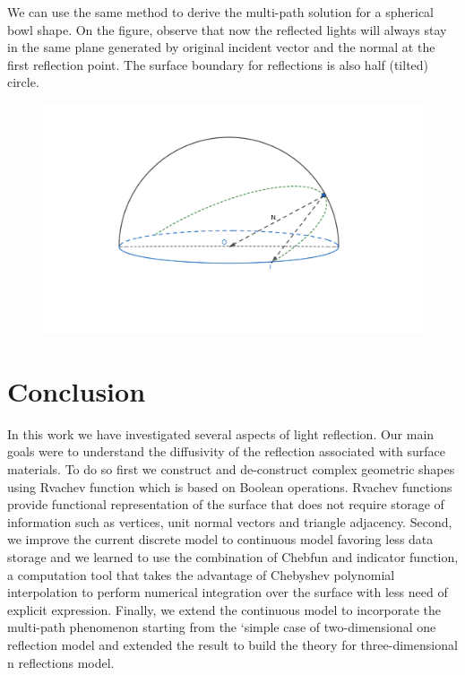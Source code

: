 \documentclass[11pt,reqno]{amsart}
\theoremstyle{definition}
\begin{document}
We can use the same method to derive the multi-path solution for a spherical bowl shape. On the figure, observe that now the reflected lights will always stay in the same plane generated by original incident vector and the normal at the first reflection point. The surface boundary for reflections is also half (tilted) circle.
 
\begin{figure}[H]
  \includegraphics[width=\textwidth]{./figs/bowl.png}
\end{figure} 

\section{Conclusion}

In this work we have investigated several aspects of light reflection. Our main goals were to understand the diffusivity of the reflection associated with surface materials. To do so first we construct and de-construct complex geometric shapes using Rvachev function which is based on Boolean operations. Rvachev functions provide functional representation of the surface that does not require storage of information such as vertices, unit normal vectors and triangle adjacency.
Second, we improve the current discrete model to continuous model favoring less data storage and we learned to use the combination of Chebfun and indicator function, a computation tool that takes the advantage of Chebyshev polynomial interpolation to perform numerical integration over the surface with less need of explicit expression.
Finally, we extend the continuous model to incorporate the multi-path phenomenon starting from the `simple case of two-dimensional one reflection model and extended the result to build the theory for three-dimensional n reflections model.
\end{document}
